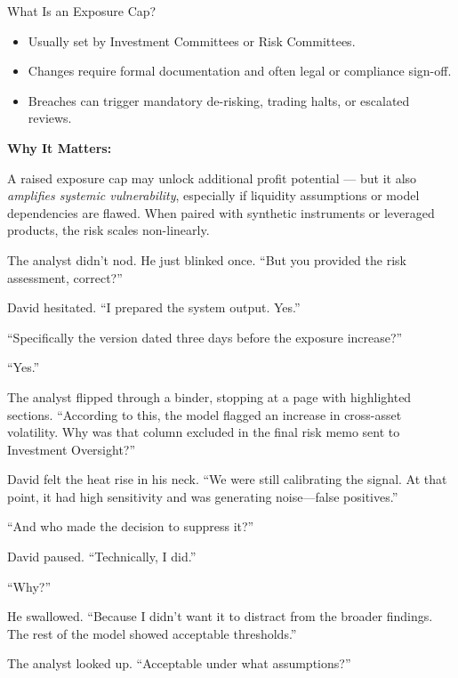 \begin{TechnicalSidebar}{What Is an Exposure Cap?}
  \medskip

  \begin{itemize}
    \item Usually set by Investment Committees or Risk Committees.
    \item Changes require formal documentation and often legal or compliance sign-off.
    \item Breaches can trigger mandatory de-risking, trading halts, or escalated reviews.
  \end{itemize}
  
  \medskip

  \textbf{Why It Matters:}  
  
  \medskip

  A raised exposure cap may unlock additional profit potential — but it also \textit{amplifies systemic 
  vulnerability}, especially if liquidity assumptions or model dependencies are flawed. When paired with 
  synthetic instruments or leveraged products, the risk scales non-linearly.
  
\end{TechnicalSidebar}

\medskip


The analyst didn’t nod. He just blinked once. ``But you provided the risk assessment, correct?''

David hesitated. ``I prepared the system output. Yes.''

``Specifically the version dated three days before the exposure increase?''

``Yes.''

The analyst flipped through a binder, stopping at a page with highlighted sections. ``According 
to this, the model 
flagged an increase in cross-asset volatility. Why was that column excluded in the final risk 
memo sent to Investment Oversight?''

David felt the heat rise in his neck. ``We were still calibrating the signal. At that point, 
it had high sensitivity and was generating noise—false positives.''

``And who made the decision to suppress it?''

David paused. ``Technically, I did.''

``Why?''

He swallowed. ``Because I didn’t want it to distract from the broader findings. The rest of the 
model showed acceptable thresholds.''

The analyst looked up. ``Acceptable under what assumptions?''

